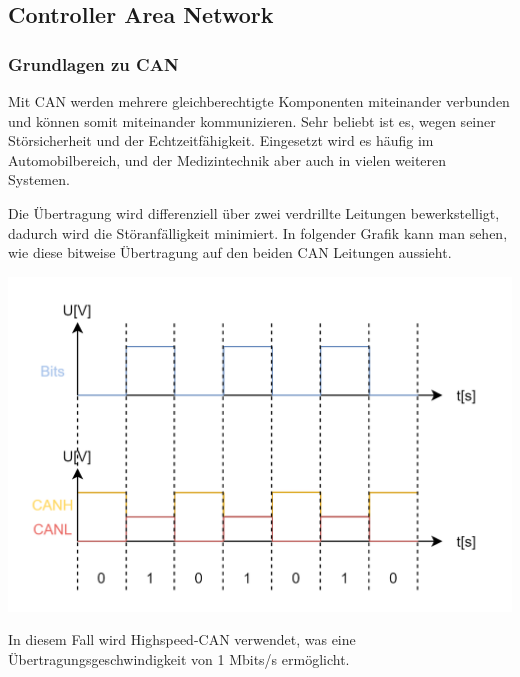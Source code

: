 \documentclass[paper=a4, 12pt]{scrreprt}
\begin{document}
		\subsection{Controller Area Network}
			\subsubsection{Grundlagen zu CAN}
			Mit CAN werden mehrere gleichberechtigte Komponenten miteinander verbunden und können somit miteinander kommunizieren. Sehr beliebt ist es, wegen seiner Störsicherheit und der Echtzeitfähigkeit. Eingesetzt wird es häufig im Automobilbereich, und der Medizintechnik aber auch in vielen weiteren Systemen.
			
			Die Übertragung wird differenziell über zwei verdrillte Leitungen bewerkstelligt, dadurch wird die Störanfälligkeit minimiert. In folgender Grafik kann man sehen, wie diese bitweise Übertragung auf den beiden CAN Leitungen aussieht.
			\begin{adjustbox}{center,caption={CAN Übertragung},label={fig:CANbits.png},nofloat=figure,vspace=\bigskipamount}
				\includegraphics[width=\textwidth]{img/CAN_bits.png}
			\end{adjustbox}
		
			In diesem Fall wird Highspeed-CAN verwendet, was eine Übertragungsgeschwindigkeit von 1 Mbits/s ermöglicht.
			\newpage
			
\end{document}
